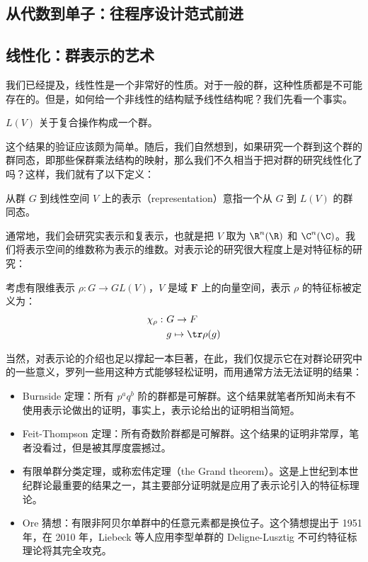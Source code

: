 \subsection{从代数到单子：往程序设计范式前进}

\subsection{线性化：群表示的艺术}

我们已经提及，线性性是一个非常好的性质。对于一般的群，这种性质都是不可能存在的。但是，如何给一个非线性的结构赋予线性结构呢？我们先看一个事实。

\begin{lemma}
    $L(V)$ 关于复合操作构成一个群。
\end{lemma}

这个结果的验证应该颇为简单。随后，我们自然想到，如果研究一个群到这个群的群同态，即那些保群乘法结构的映射，那么我们不久相当于把对群的研究线性化了吗？这样，我们就有了以下定义：

\begin{definition}
    从群 $G$ 到线性空间 $V$ 上的表示（representation）意指一个从 $G$ 到 $L(V)$ 的群同态。
\end{definition}

通常地，我们会研究实表示和复表示，也就是把 $V$ 取为 $\R^n(\R)$ 和 $\C^n(\C)$。我们将表示空间的维数称为表示的维数。对表示论的研究很大程度上是对特征标的研究：

\begin{definition}
    考虑有限维表示 $\rho: G \to GL(V)$，$V$ 是域 $\mathbf{F}$ 上的向量空间，表示 $\rho$ 的特征标被定义为：
    \begin{align*}
        \chi_\rho:\ &  G \to F\\
        & g  \mapsto  \tr \rho(g)
    \end{align*}
\end{definition}

当然，对表示论的介绍也足以撑起一本巨著，在此，我们仅提示它在对群论研究中的一些意义，罗列一些用这种方式能够轻松证明，而用通常方法无法证明的结果：

\begin{itemize}
    \item Burnside 定理：所有 $p^aq^b$ 阶的群都是可解群。这个结果就笔者所知尚未有不使用表示论做出的证明，事实上，表示论给出的证明相当简短。
    \item Feit-Thompson 定理：所有奇数阶群都是可解群。这个结果的证明非常厚，笔者没看过，但是被其厚度震撼过。
    \item 有限单群分类定理，或称宏伟定理（the Grand theorem）。这是上世纪到本世纪群论最重要的结果之一，其主要部分证明就是应用了表示论引入的特征标理论。
    \item Ore 猜想：有限非阿贝尔单群中的任意元素都是换位子。这个猜想提出于 1951 年，在 2010 年，Liebeck 等人应用李型单群的 Deligne-Lusztig 不可约特征标理论将其完全攻克。
\end{itemize}

